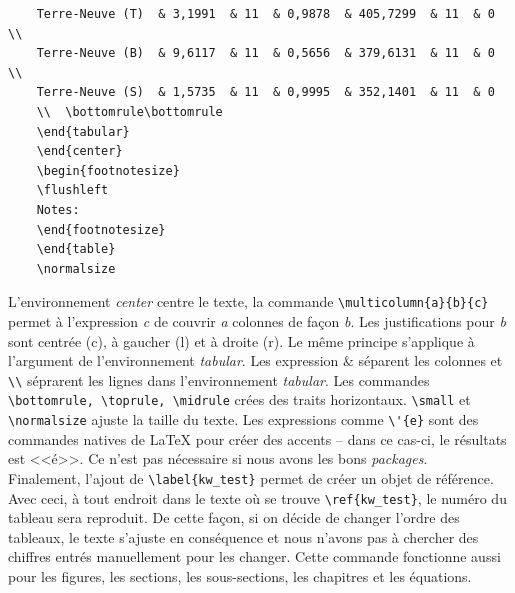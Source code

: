 \documentclass[12pt]{article}
\begin{document}
\begin{lstlisting}
	Terre-Neuve (T)  & 3,1991  & 11  & 0,9878  & 405,7299  & 11  & 0  \\                                                                                                                                                                                                                
	Terre-Neuve (B)  & 9,6117  & 11  & 0,5656  & 379,6131  & 11  & 0  \\                                                                                                                                                                                                                
	Terre-Neuve (S)  & 1,5735  & 11  & 0,9995  & 352,1401  & 11  & 0 
	\\  \bottomrule\bottomrule                                                                                                                                                                               
	\end{tabular}    
	\end{center}     
	\begin{footnotesize}  
	\flushleft     
	Notes: 
	\end{footnotesize}   
	\end{table}  
	\normalsize
	\end{lstlisting}
	
	L'environnement \textit{center} centre le texte, la commande \lstinline|\multicolumn{a}{b}{c}| permet à l'expression \textit{c} de couvrir \textit{a} colonnes de façon \textit{b}. Les justifications pour \textit{b} sont centrée (c), à gaucher (l) et à droite (r). Le même principe s'applique à l'argument de l'environnement \textit{tabular}. Les expression \& séparent les colonnes et \lstinline|\\| séprarent les lignes dans l'environnement \textit{tabular}. Les commandes \lstinline|\bottomrule, \toprule, \midrule| crées des traits horizontaux. \lstinline|\small| et \lstinline|\normalsize| ajuste la taille du texte. Les expressions comme \lstinline|\'{e}| sont des commandes natives de LaTeX pour créer des accents -- dans ce cas-ci, le résultats est <<é>>. Ce n'est pas nécessaire si nous avons les bons \textit{packages}. \\
	
	Finalement, l'ajout de \lstinline|\label{kw_test}| permet de créer un objet de référence. Avec ceci, à tout endroit dans le texte où se trouve \lstinline|\ref{kw_test}|, le numéro du tableau sera reproduit. De cette façon, si on décide de changer l'ordre des tableaux, le texte s'ajuste en conséquence et nous n'avons pas à chercher des chiffres entrés manuellement pour les changer. Cette commande fonctionne aussi pour les figures, les sections, les sous-sections, les chapitres et les équations.\\
	
\end{document}
